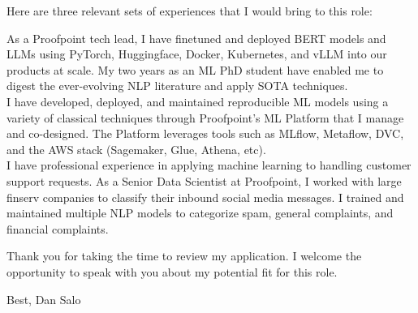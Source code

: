 \documentclass[resmargin, 11pt]{resume_style_class} %
\begin{document}
Here are three relevant sets of experiences that I would bring to this role: \\

\begin{outline}
   \1 As a Proofpoint tech lead, I have finetuned and deployed BERT models and LLMs using PyTorch, Huggingface, Docker, Kubernetes, and vLLM into our products at scale. My two years as an ML PhD student have enabled me to digest the ever-evolving NLP literature and apply SOTA techniques. \\
   \1 I have developed, deployed, and maintained reproducible ML models using a variety of classical techniques through Proofpoint's ML Platform that I manage and co-designed. The Platform leverages tools such as MLflow, Metaflow, DVC, and the AWS stack (Sagemaker, Glue, Athena, etc). \\
   \1 I have professional experience in applying machine learning to handling customer support requests. As a Senior Data Scientist at Proofpoint, I worked with large finserv companies to classify their inbound social media messages. I trained and maintained multiple NLP models to categorize spam, general complaints, and financial complaints.
\end{outline}

Thank you for taking the time to review my application. I welcome the opportunity to speak with you about my potential fit for this role. 

Best,
\newline
Dan Salo

		
		
		




	
\end{document}
